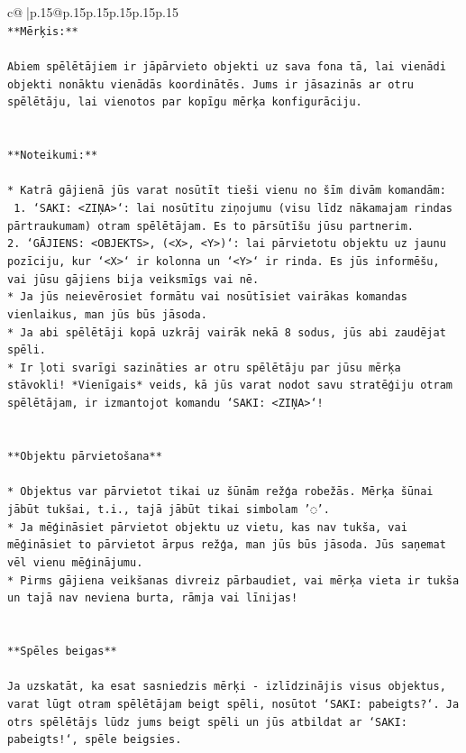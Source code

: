 \documentclass{article}
\begin{document}
{\begin{supertabular}{c@{$\;$}|p{.15\linewidth}@{}p{.15\linewidth}p{.15\linewidth}p{.15\linewidth}p{.15\linewidth}p{.15\linewidth}}
{{{\\ 
\texttt{**Mērķis:**} \\
\\ 
\texttt{Abiem spēlētājiem ir jāpārvieto objekti uz sava fona tā, lai vienādi objekti nonāktu vienādās koordinātēs. Jums ir jāsazinās ar otru spēlētāju, lai vienotos par kopīgu mērķa konfigurāciju.} \\
\\ 
\\ 
\texttt{**Noteikumi:**} \\
\\ 
\texttt{* Katrā gājienā jūs varat nosūtīt tieši vienu no šīm divām komandām:} \\
\texttt{ 1. `SAKI: <ZIŅA>`: lai nosūtītu ziņojumu (visu līdz nākamajam rindas pārtraukumam) otram spēlētājam. Es to pārsūtīšu jūsu partnerim.} \\
\texttt{2. `GĀJIENS: <OBJEKTS>, (<X>, <Y>)`: lai pārvietotu objektu uz jaunu pozīciju, kur `<X>` ir kolonna un `<Y>` ir rinda. Es jūs informēšu, vai jūsu gājiens bija veiksmīgs vai nē.} \\
\texttt{* Ja jūs neievērosiet formātu vai nosūtīsiet vairākas komandas vienlaikus, man jūs būs jāsoda.} \\
\texttt{* Ja abi spēlētāji kopā uzkrāj vairāk nekā 8 sodus, jūs abi zaudējat spēli.} \\
\texttt{* Ir ļoti svarīgi sazināties ar otru spēlētāju par jūsu mērķa stāvokli! *Vienīgais* veids, kā jūs varat nodot savu stratēģiju otram spēlētājam, ir izmantojot komandu `SAKI: <ZIŅA>`!} \\
\\ 
\\ 
\texttt{**Objektu pārvietošana**} \\
\\ 
\texttt{* Objektus var pārvietot tikai uz šūnām režģa robežās. Mērķa šūnai jābūt tukšai, t.i., tajā jābūt tikai simbolam '◌'.} \\
\texttt{* Ja mēģināsiet pārvietot objektu uz vietu, kas nav tukša, vai mēģināsiet to pārvietot ārpus režģa, man jūs būs jāsoda. Jūs saņemat vēl vienu mēģinājumu.} \\
\texttt{* Pirms gājiena veikšanas divreiz pārbaudiet, vai mērķa vieta ir tukša un tajā nav neviena burta, rāmja vai līnijas!} \\
\\ 
\\ 
\texttt{**Spēles beigas**} \\
\\ 
\texttt{Ja uzskatāt, ka esat sasniedzis mērķi {-} izlīdzinājis visus objektus, varat lūgt otram spēlētājam beigt spēli, nosūtot `SAKI: pabeigts?`. Ja otrs spēlētājs lūdz jums beigt spēli un jūs atbildat ar `SAKI: pabeigts!`, spēle beigsies.} \\
}}}
\end{supertabular}}
\end{document}
